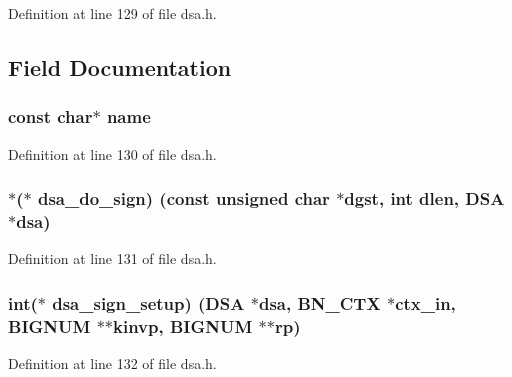 Definition at line 129 of file dsa.\+h.



\subsection{Field Documentation}
\subsubsection[{\texorpdfstring{name}{name}}]{\setlength{\rightskip}{0pt plus 5cm}const char$\ast$ name}\hypertarget{structdsa__method_a8f8f80d37794cde9472343e4487ba3eb}{}\label{structdsa__method_a8f8f80d37794cde9472343e4487ba3eb}


Definition at line 130 of file dsa.\+h.

\subsubsection[{\texorpdfstring{dsa\+\_\+do\+\_\+sign}{dsa_do_sign}}]{$\ast$($\ast$ dsa\+\_\+do\+\_\+sign) (const unsigned char $\ast$dgst, int dlen, {\bf D\+SA} $\ast$dsa)}\hypertarget{structdsa__method_a6f3a5323466cd100b9bf9f7c111670d7}{}\label{structdsa__method_a6f3a5323466cd100b9bf9f7c111670d7}


Definition at line 131 of file dsa.\+h.

\subsubsection[{\texorpdfstring{dsa\+\_\+sign\+\_\+setup}{dsa_sign_setup}}]{\setlength{\rightskip}{0pt plus 5cm}int($\ast$ dsa\+\_\+sign\+\_\+setup) ({\bf D\+SA} $\ast$dsa, {\bf B\+N\+\_\+\+C\+TX} $\ast$ctx\+\_\+in, {\bf B\+I\+G\+N\+UM} $\ast$$\ast$kinvp, {\bf B\+I\+G\+N\+UM} $\ast$$\ast$rp)}\hypertarget{structdsa__method_af0059982f4eccb54a9d0f2f908a48eba}{}\label{structdsa__method_af0059982f4eccb54a9d0f2f908a48eba}


Definition at line 132 of file dsa.\+h.

